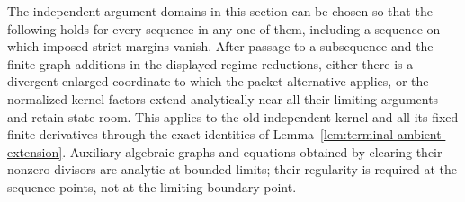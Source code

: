 \begin{lemma}
\label{lem:terminal-boundary-corners}
The independent-argument domains in this section can be chosen so that the
following holds for every sequence in any one of them, including a sequence
on which imposed strict margins vanish.  After passage to a subsequence
and the finite graph additions in the displayed regime reductions, either
there is a divergent enlarged coordinate to which the packet alternative
applies, or the normalized kernel factors extend analytically near all
their limiting arguments and retain state room.  This applies to the old
independent kernel and all its fixed finite derivatives through the exact
identities of Lemma~\ref{lem:terminal-ambient-extension}.  Auxiliary
algebraic graphs and equations obtained by clearing their nonzero divisors
are analytic at bounded limits; their regularity is required at the
sequence points, not at the limiting boundary point.
\end{lemma}
